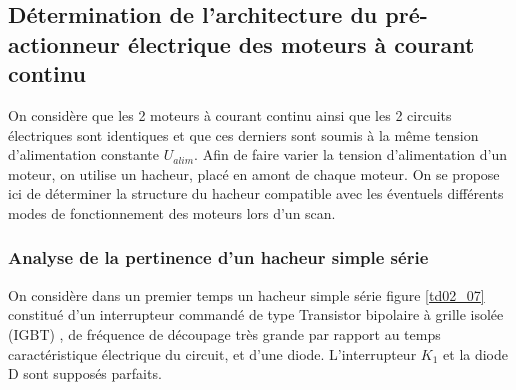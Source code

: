 %
%
%
%
%
%
%
%

\subsection{Détermination de l'architecture du pré-actionneur électrique des moteurs à courant continu}

On considère que les 2 moteurs à courant continu ainsi que les 2 circuits électriques sont identiques et que ces derniers sont soumis à la même tension d'alimentation constante $U_{alim}$. Afin de faire varier la tension d'alimentation d'un moteur, on utilise un hacheur, placé en amont de chaque moteur. On se propose ici de déterminer la structure du hacheur compatible avec les éventuels différents modes de fonctionnement des moteurs lors d'un scan.

\subsubsection{Analyse de la pertinence d'un hacheur simple série}

On considère dans un premier temps un hacheur simple série figure \ref{td02_07} constitué d'un interrupteur commandé de type \og Transistor bipolaire à grille isolée (IGBT) \fg, de fréquence de découpage très grande par rapport au temps caractéristique électrique du circuit, et d'une diode. L'interrupteur $K_1$ et la diode D sont supposés parfaits.

